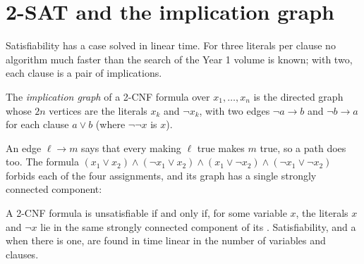 \section{2-SAT and the implication graph}\label{sec:b2:predicate-logic:2sat}

Satisfiability has a case solved in linear time. For three literals per clause no algorithm much faster than the
search of the Year 1 volume is known; with two, each clause is a pair of implications.

\begin{definition}\label{def:b2:predicate-logic:implication-graph}
The \emph{implication graph} of a 2-CNF formula over $x_1, \dots, x_n$ is the directed graph
whose $2n$ vertices are the literals $x_k$ and $\neg x_k$, with two edges $\neg a \to b$ and $\neg b \to a$ for each
clause $a \vee b$ (where $\neg\neg x$ is $x$).
\end{definition}

An edge $\ell \to m$ says that every  making $\ell$ true makes $m$ true, so a path does too. The formula $(x_1 \vee
x_2) \wedge (\neg x_1 \vee x_2) \wedge (x_1 \vee \neg x_2) \wedge (\neg x_1 \vee \neg x_2)$ forbids each of the four
assignments, and its graph has a single strongly connected component:

\begin{omfigure}
\par{}
\end{omfigure}

\begin{theorem}\label{thm:b2:predicate-logic:2sat}
A 2-CNF formula is unsatisfiable if and only if, for some variable $x$, the literals $x$ and $\neg x$ lie in the same
strongly connected component of its . Satisfiability, and a  when there is one, are found in time
linear in the number of variables and clauses.
\end{theorem}

